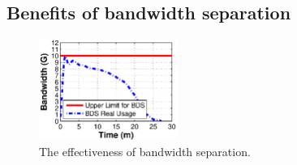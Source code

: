 \begin{table}[t]
\begin{center}
\end{center}
\vspace{-0.4cm}
\caption{[\name vs. Bullet \cite{kostic2003bullet}, Akamai \cite{Andreev2013Designing}] Results from trace-driven simulations.}
\label{table:versusAkamai}
\end{table}


\subsection{Benefits of bandwidth separation}
\label{subsec:evaluation:separation}
\begin{figure}[t]
  \centering
  \includegraphics[width=45mm]{images/Quota.eps}
  \caption{The effectiveness of bandwidth separation.}
  \label{fig:quota}
\end{figure}

